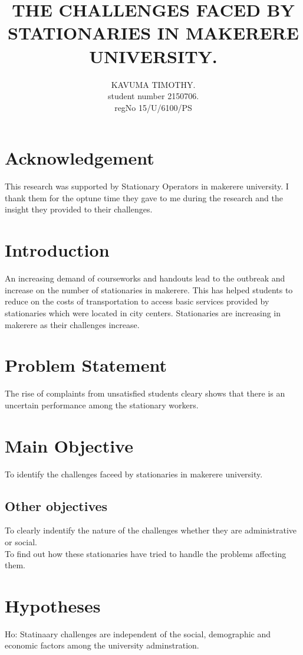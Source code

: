 \documentclass[a4paper,10pt]{article}
\begin{document}
\title{THE CHALLENGES FACED BY STATIONARIES IN MAKERERE UNIVERSITY.}
\author{
KAVUMA TIMOTHY.\\
student number 2150706.\\
regNo  15/U/6100/PS
}


\maketitle
\newpage
\section{Acknowledgement}
This research was supported by Stationary Operators in makerere university. I thank  them for the optune time they gave to me during the research  and the insight they provided to their challenges.

\tableofcontents
\newpage
{}
\section{Introduction}
An increasing demand of courseworks and handouts lead to the outbreak and increase on the number of stationaries in makerere. This has helped students to reduce on the costs of transportation to access basic services provided by stationaries which were located in city centers. Stationaries are increasing in makerere as their challenges increase.

\section{ Problem Statement}
The rise of complaints from unsatisfied students cleary shows that there is an uncertain performance among the stationary workers. 
\section{Main Objective}
To identify the challenges faceed by stationaries in makerere university.
\subsection{Other objectives}
To clearly indentify the nature of the challenges whether they are administrative or social.\\
To find out how these stationaries have tried to handle the problems affecting them.

\section{Hypotheses}
Ho: Statinaary challenges are independent of the social, demographic and economic factors among the university adminstration.
\end{document}
